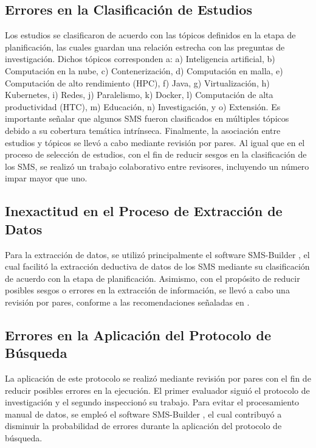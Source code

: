 \subsection{Errores en la Clasificación de Estudios}
Los estudios se clasificaron de acuerdo con las tópicos definidos en la etapa de planificación, las cuales guardan una relación estrecha con las preguntas de investigación.
Dichos tópicos corresponden a: a) Inteligencia artificial, b) Computación en la nube, c) Contenerización, d) Computación en malla, e) Computación de alto rendimiento (HPC), f) Java, g) Virtualización, h) Kubernetes, i) Redes, j) Paralelismo, k) Docker, l) Computación de alta productividad (HTC), m) Educación, n) Investigación, y o) Extensión.
Es importante señalar que algunos SMS fueron clasificados en múltiples tópicos debido a su cobertura temática intrínseca. Finalmente, la asociación entre estudios y tópicos se llevó a cabo mediante revisión por pares. Al igual que en el proceso de selección de estudios, con el fin de reducir sesgos en la clasificación de los SMS, se realizó un trabajo colaborativo entre revisores, incluyendo un número impar mayor que uno.

\subsection{Inexactitud en el Proceso de Extracción de Datos}
Para la extracción de datos, se utilizó principalmente el software SMS-Builder \cite{sms-builder-repo}, el cual facilitó la extracción deductiva de datos de los SMS mediante su clasificación de acuerdo con la etapa de planificación. Asimismo, con el propósito de reducir posibles sesgos o errores en la extracción de información, se llevó a cabo una revisión por pares, conforme a las recomendaciones señaladas en \cite{Kitchenham2010792}.

\subsection{Errores en la Aplicación del Protocolo de Búsqueda}
La aplicación de este protocolo se realizó mediante revisión por pares con el fin de reducir posibles errores en la ejecución. El primer evaluador siguió el protocolo de investigación y el segundo inspeccionó su trabajo. Para evitar el procesamiento manual de datos, se empleó el software SMS-Builder \cite{sms-builder-repo}, el cual contribuyó a disminuir la probabilidad de errores durante la aplicación del protocolo de búsqueda.
